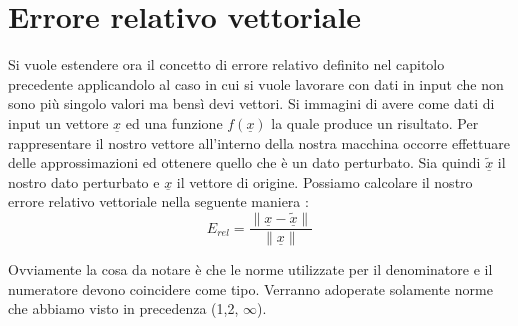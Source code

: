 \documentclass[12pt, a4paper]{book}
\theoremstyle{definition}
\newcommand{\VarMtrx}[1]{\ensuremath{\underline{#1}}}
\begin{document}
\section{Errore relativo vettoriale}
\begin{flushleft}
Si vuole estendere ora il concetto di errore relativo definito nel capitolo precedente applicandolo al caso in cui si vuole lavorare con dati in input che non sono più singolo valori ma bensì devi vettori. 
Si immagini di avere come dati di input un vettore \VarMtrx{x} ed una funzione $f(\VarMtrx{x})$ la quale produce un risultato. Per rappresentare il nostro vettore all'interno della nostra macchina occorre effettuare delle approssimazioni ed ottenere quello che  è un dato perturbato.
Sia quindi $\widetilde{\VarMtrx{x}}$ il nostro dato perturbato e  \VarMtrx{x} il vettore di origine. Possiamo calcolare il nostro errore relativo vettoriale nella seguente maniera : 
\[  E_{rel} = \frac{\lVert \VarMtrx{x} - \widetilde{\VarMtrx{x}}\rVert }{\lVert\VarMtrx{x}\rVert}\]

Ovviamente la cosa da notare  è che le norme utilizzate per il denominatore e il numeratore devono coincidere come tipo. Verranno adoperate solamente norme che abbiamo visto in precedenza (1,2,  $\infty$).
\end{flushleft}
\end{document}
